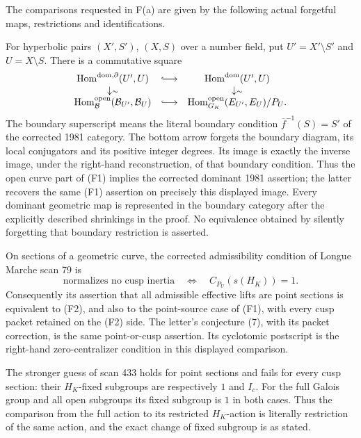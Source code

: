\begin{proposition}
\label{F-manuscript-comparison}
The comparisons requested in F(a) are given by the following
actual forgetful maps, restrictions and identifications.

For hyperbolic pairs $(X',S')$, $(X,S)$ over a number field,
put $U'=X'\setminus S'$ and $U=X\setminus S$. There is a
commutative square
\[
\begin{array}{ccc}
 \operatorname{Hom}^{\rm dom,\partial}(U',U)&\lhook\joinrel\longrightarrow&
                 \operatorname{Hom}^{\rm dom}(U',U)\\
 \downarrow\scriptstyle\sim&&\downarrow\scriptstyle\sim\\
 \operatorname{Hom}^{\rm open}_{\mathcal B}(\mathcal B_{U'},\mathcal B_U)
       &\lhook\joinrel\longrightarrow&
 \operatorname{Hom}^{\rm open}_{G_K}(E_{U'},E_U)/P_U .
\end{array}
\]
The boundary superscript means the literal boundary condition
$\overline f^{-1}(S)=S'$ of the corrected 1981 category.
The bottom arrow forgets the boundary diagram, its local
conjugators and its positive integer degrees. Its image is
exactly the inverse image, under the right-hand reconstruction,
of that boundary condition. Thus the open curve part of (F1)
implies the corrected dominant 1981 assertion; the latter
recovers the same (F1) assertion on precisely this displayed
image. Every dominant geometric map is represented in the
boundary category after the explicitly described shrinkings
in the proof. No equivalence obtained by silently forgetting
that boundary restriction is asserted.

On sections of a geometric curve, the corrected admissibility
condition of Longue Marche scan 79 is
\[
 \text{normalizes no cusp inertia}
 \quad\Longleftrightarrow\quad C_{P_U}(s(H_K))=1.
\]
Consequently its assertion that all admissible effective lifts
are point sections is equivalent to (F2), and also to the
point-source case of (F1), with every cusp packet retained on
the (F2) side. The letter's conjecture (7), with its packet
correction, is the same point-or-cusp assertion. Its
cyclotomic postscript is the right-hand zero-centralizer
condition in this displayed comparison.

The stronger guess of scan 433 holds for point sections and
fails for every cusp section: their $H_K$-fixed subgroups are
respectively $1$ and $I_c$. For the full Galois group and all
open subgroups its fixed subgroup is $1$ in both cases.
Thus the comparison from the full action to its restricted
$H_K$-action is literally restriction of the same action,
and the exact change of fixed subgroup is as stated.


\end{proposition}
